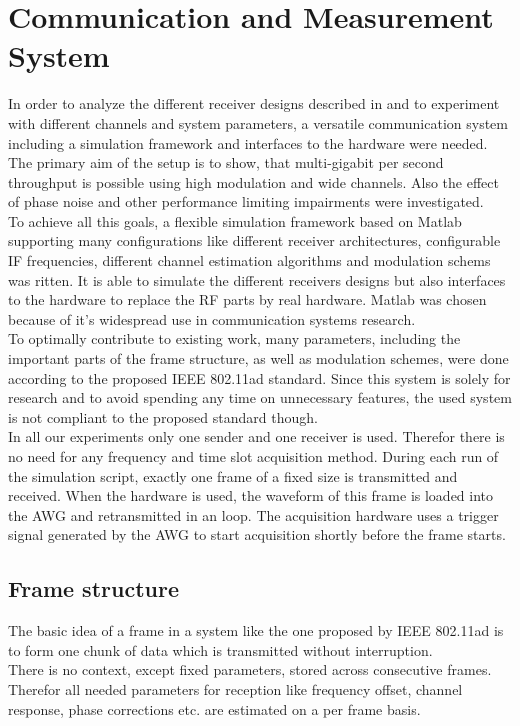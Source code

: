 \chapter{Communication and Measurement System}
\label{chap:sys}

In order to analyze the different receiver designs described in
 and to experiment with different channels
and system parameters, a versatile communication system
including a simulation framework and interfaces to the hardware
were needed. \\

The primary aim of the setup is to show, that multi-gigabit per second
throughput is possible using high modulation and wide channels.
Also the effect of phase noise and other performance limiting impairments
were investigated. \\

To achieve all this goals, a flexible simulation framework based on Matlab
supporting many configurations like different receiver architectures,
configurable \gls{IF} frequencies, different channel estimation algorithms
and modulation schems was ritten. It is able to simulate
the different receivers designs but also interfaces to the hardware
to replace the \gls{RF} parts by real hardware. Matlab was chosen
because of it's widespread use in communication systems research. \\

To optimally contribute to existing work, many parameters, including
the important parts of the frame structure, as well as modulation
schemes, were done according to the proposed \gls{IEEE} 802.11ad standard.
Since this system is solely for research and to avoid spending any
time on unnecessary features, the used system is not compliant to the
proposed standard though. \\

In all our experiments only one sender and one receiver is used.
Therefor there is no need for any frequency and time slot acquisition
method. During each run of the simulation script, exactly one frame
of a fixed size is transmitted and received.
When the hardware is used, the waveform of this frame is loaded into
the \gls{AWG} and retransmitted in an loop.
The acquisition hardware uses a trigger signal generated by the \gls{AWG}
to start acquisition shortly before the frame starts.

\section{Frame structure}
\label{sec:sys_frame_struct}
The basic idea of a frame in a system like the one proposed by
IEEE 802.11ad is to form one chunk of data which is transmitted without
interruption. \\
There is no context, except fixed parameters, stored across consecutive
frames. Therefor all needed parameters for reception like frequency offset,
channel response, phase corrections etc. are estimated on a per frame basis. \\

